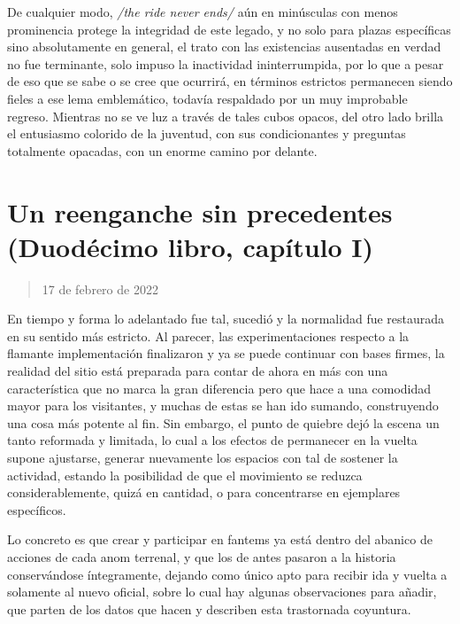\documentclass[
]{book}
\begin{document}
De cualquier modo, \emph{/the ride never ends/} aún en minúsculas con menos prominencia protege la integridad de este legado, y no solo para plazas específicas sino absolutamente en general, el trato con las existencias ausentadas en verdad no fue terminante, solo impuso la inactividad ininterrumpida, por lo que a pesar de eso que se sabe o se cree que ocurrirá, en términos estrictos permanecen siendo fieles a ese lema emblemático, todavía respaldado por un muy improbable regreso. Mientras no se ve luz a través de tales cubos opacos, del otro lado brilla el entusiasmo colorido de la juventud, con sus condicionantes y preguntas totalmente opacadas, con un enorme camino por delante.

\hypertarget{un-reenganche-sin-precedentes-duoduxe9cimo-libro-capuxedtulo-i}{%
\section{Un reenganche sin precedentes (Duodécimo libro, capítulo I)}\label{un-reenganche-sin-precedentes-duoduxe9cimo-libro-capuxedtulo-i}}

\begin{quote}
17 de febrero de 2022
\end{quote}

En tiempo y forma lo adelantado fue tal, sucedió y la normalidad fue restaurada en su sentido más estricto. Al parecer, las experimentaciones respecto a la flamante implementación finalizaron y ya se puede continuar con bases firmes, la realidad del sitio está preparada para contar de ahora en más con una característica que no marca la gran diferencia pero que hace a una comodidad mayor para los visitantes, y muchas de estas se han ido sumando, construyendo una cosa más potente al fin. Sin embargo, el punto de quiebre dejó la escena un tanto reformada y limitada, lo cual a los efectos de permanecer en la vuelta supone ajustarse, generar nuevamente los espacios con tal de sostener la actividad, estando la posibilidad de que el movimiento se reduzca considerablemente, quizá en cantidad, o para concentrarse en ejemplares específicos.

Lo concreto es que crear y participar en fantems ya está dentro del abanico de acciones de cada anom terrenal, y que los de antes pasaron a la historia conservándose íntegramente, dejando como único apto para recibir ida y vuelta a solamente al nuevo oficial, sobre lo cual hay algunas observaciones para añadir, que parten de los datos que hacen y describen esta trastornada coyuntura.
\end{document}
